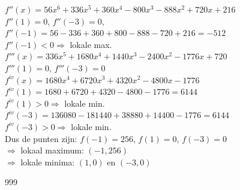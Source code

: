 \documentclass[a4paper]{article}
\begin{document}
$f''(x) = 56x^6+336x^5+360x^4-800x^3-888x^2+720x+216$\\

$f''(1) = 0$, $f''(-3) = 0$, $f''(-1) = 56-336+360+800-888-720+216 = -512$\\

$f''(-1) < 0 \Rightarrow$ lokale max.\\

$f'''(x) = 336x^5+1680x^4+1440x^3-2400x^2-1776x+720$\\

$f'''(1) = 0$, $f'''(-3) = 0$\\

$f^{iv}(x) = 1680x^4+6720x^3+4320x^2-4800x-1776$\\

$f^{iv}(1) = 1680+6720+4320-4800-1776 = 6144$\\

$f^{iv}(1) > 0 \Rightarrow$ lokale min.\\

$f^{iv}(-3) = 136080-181440+38880+14400-1776 = 6144$\\

$f^{iv}(-3) > 0 \Rightarrow$ lokale min.\\

Dus de punten zijn: $f(-1)=256$, $f(1)=0$, $f(-3)=0$\\

$\Rightarrow$ lokaal maximum: $(-1,256)$\\

$\Rightarrow$ lokale minima: $(1,0)$ en $(-3,0)$\\

\begin{thebibliography}{999}
\end{thebibliography}
\end{document}
